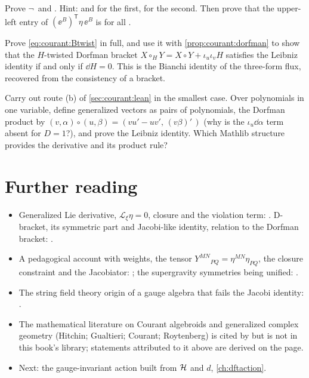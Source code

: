 \begin{exercise}
Prove $\neg\,$ and . Hint:  and
 for the first,  for the second. Then prove that the upper-left entry of
$(\ee^B)^{\mathsf T}\eta\,\ee^B$ is  for all .
\end{exercise}

\begin{exercise}[$\star\star\star$]
Prove \eqref{eq:courant:Btwist} in full, and use it with \cref{prop:courant:dorfman} to show that the
$H$-twisted Dorfman bracket $X\circ_HY=X\circ Y+\iota_u\iota_vH$ satisfies the Leibniz identity if
and only if $\dd H=0$. This is the Bianchi identity of the three-form flux, recovered from the
consistency of a bracket.
\end{exercise}

\begin{exercise}
Carry out route (b) of \cref{sec:courant:lean} in the smallest case. Over polynomials in one
variable, define generalized vectors as pairs of polynomials, the Dorfman product by
$(v,\alpha)\circ(u,\beta)=(vu'-uv',\,(v\beta)'\,)$ (why is the $\iota_u\dd\alpha$ term absent for
$D=1$?), and prove the Leibniz identity. Which Mathlib structure provides the derivative and its
product rule?
\end{exercise}

\section*{Further reading}
\begin{itemize}[nosep,leftmargin=*]
\item Generalized Lie derivative, $\mathcal L_\xi\eta=0$, closure and the violation term:
. D-bracket, its symmetric part and Jacobi-like identity,
relation to the Dorfman bracket: .
\item A pedagogical account with weights, the tensor $Y^{MN}{}_{PQ}=\eta^{MN}\eta_{PQ}$, the
closure constraint and the Jacobiator: ; the supergravity
symmetries being unified: .
\item The string field theory origin of a gauge algebra that fails the Jacobi identity:
.
\item The mathematical literature on Courant algebroids and generalized complex geometry
(Hitchin; Gualtieri; Courant; Roytenberg) is cited by  but is not in this book's library; statements attributed to it above are derived
on the page.
\item Next: the gauge-invariant action built from $\mathcal{H}$ and $d$, \cref{ch:dftaction}.
\end{itemize}
